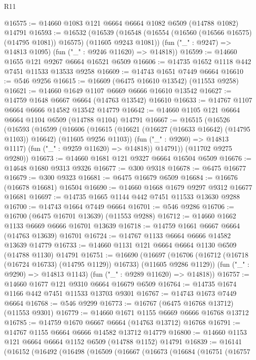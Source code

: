 \begin{lexlean}{R11}
\begin{coremodule}
{{{{{{{{{{{{{{{{{{{{{{{{{{{{{{{{{{{{{{{{{{{{{{{{{{{{{{{{{{{{{{{{{{{{{{{{{{{{{{{{{{@16575 := @14660 @1083 @121 @6664 @6664 @1082 @6509 (@14788 @1082) @14791
@16593 := @16532
    (@16539
      (@16548 (@16554 (@16560 (@16566 @16575) (@14795 @1081)) @16575) (@11605 @9243 @1081))
      (fun ("_" : @9247) => @14813 @1095)
      (fun ("_" : @9246 @11620) => @14818))
@16599 := @14660 @1655 @121 @9267 @6664 @16521 @6509
@16606 := @14735 @1652 @1118 @442 @7451 @11533 @13533 @9258
@16609 := @14743 @1651 @7449 @6664
@16610 := @546 @9256
@16615 := @16609 (@6475 @16610 @13542) (@11553 @9258)
@16621 := @14660 @1649 @1107 @6669 @6666 @16610 @13542
@16627 := @14759 @1648 @6667 @6664 (@14763 @13542) @16610
@16633 := @14767 @1107 @6664 @6666 @14582 @13542 @14779
@16642 := @14660 @1105 @121 @6664 @6664 @1104 @6509 (@14788 @1104) @14791
@16667 := @16515
    (@16526
      (@16593
        (@16599
          (@16606
            (@16615 (@16621 (@16627 (@16633 @16642) (@14795 @1103)) @16642) (@11605 @9256 @1103))
            (fun ("_" : @9260) => @14813 @1117)
            (fun ("_" : @9259 @11620) => @14818))
          @14791))
      (@11702 @9275 @9280))
@16673 := @14660 @1681 @121 @9327 @6664 @16504 @6509
@16676 := @14648 @1680 @9313 @9326
@16677 := @300 @9318
@16678 := @6475 @16677
@16679 := @300 @9323
@16681 := @6475 @16679 @6509
@16684 := @16676 (@16678 @16681) @16504
@16690 := @14660 @1668 @1679 @9297 @9312 @16677 @16681
@16697 := @14735 @1665 @1144 @442 @7451 @11533 @13630 @9288
@16700 := @14743 @1664 @7449 @6664
@16701 := @546 @9286
@16706 := @16700 (@6475 @16701 @13639) (@11553 @9288)
@16712 := @14660 @1662 @1133 @6669 @6666 @16701 @13639
@16718 := @14759 @1661 @6667 @6664 (@14763 @13639) @16701
@16724 := @14767 @1133 @6664 @6666 @14582 @13639 @14779
@16733 := @14660 @1131 @121 @6664 @6664 @1130 @6509 (@14788 @1130) @14791
@16751 := @16690
    (@16697
      (@16706 (@16712 (@16718 (@16724 @16733) (@14795 @1129)) @16733) (@11605 @9286 @1129))
      (fun ("_" : @9290) => @14813 @1143)
      (fun ("_" : @9289 @11620) => @14818))
@16757 := @14660 @1677 @121 @9310 @6664 @16679 @6509
@16764 := @14735 @1674 @1166 @442 @7451 @11533 @13703 @9301
@16767 := @14743 @1673 @7449 @6664
@16768 := @546 @9299
@16773 := @16767 (@6475 @16768 @13712) (@11553 @9301)
@16779 := @14660 @1671 @1155 @6669 @6666 @16768 @13712
@16785 := @14759 @1670 @6667 @6664 (@14763 @13712) @16768
@16791 := @14767 @1155 @6664 @6666 @14582 @13712 @14779
@16800 := @14660 @1153 @121 @6664 @6664 @1152 @6509 (@14788 @1152) @14791
@16839 := @16141
    (@16152
      (@16492
        (@16498
          (@16509
            (@16667
              (@16673
                (@16684
                  (@16751
                    (@16757
}}}}}}}}}}}}}}}}}}}}}}}}}}}}}}}}}}}}}}}}}}}}}}}}}}}}}}}}}}}}}}}}}}}}}}}}}}}}}}}}}}
\end{coremodule}
\end{lexlean}
